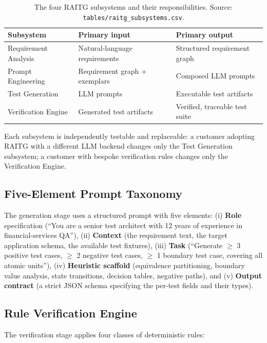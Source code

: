 \documentclass[10pt,twocolumn,letterpaper]{article}
\begin{document}
\begin{table}[H]
\centering
\caption{The four RAITG subsystems and their responsibilities.
Source: \texttt{tables/raitg\_subsystems.csv}.}
\label{tab:subsystems}
\small
\begin{tabular}{p{2.5cm}p{2.3cm}p{2.5cm}}
\toprule
Subsystem & Primary input & Primary output \\
\midrule
Requirement Analysis & Natural-language requirements & Structured requirement graph \\
Prompt Engineering & Requirement graph + exemplars & Composed LLM prompts \\
Test Generation & LLM prompts & Executable test artifacts \\
Verification Engine & Generated test artifacts & Verified, traceable test suite \\
\bottomrule
\end{tabular}
\end{table}

Each subsystem is independently testable and replaceable: a customer
adopting RAITG with a different LLM backend changes only the Test
Generation subsystem; a customer with bespoke verification rules
changes only the Verification Engine.

\subsection{Five-Element Prompt Taxonomy}

The generation stage uses a structured prompt with five elements:
(i) \textbf{Role} specification (``You are a senior test architect with
12 years of experience in financial-services QA''), (ii)
\textbf{Context} (the requirement text, the target application schema,
the available test fixtures), (iii) \textbf{Task} (``Generate
$\geq$ 3 positive test cases, $\geq$ 2 negative test cases, $\geq$ 1
boundary test case, covering all atomic units''), (iv) \textbf{Heuristic
scaffold} (equivalence partitioning, boundary value analysis, state
transitions, decision tables, negative paths), and (v) \textbf{Output
contract} (a strict JSON schema specifying the per-test fields and
their types).

\subsection{Rule Verification Engine}

The verification stage applies four classes of deterministic rules:
\end{document}
